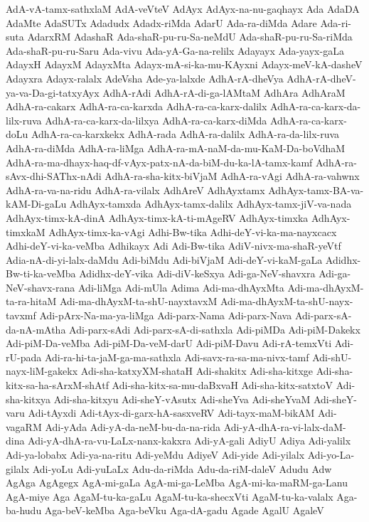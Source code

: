 {AdA-vA-tamx-sathxlaM
AdA-veVteV
AdAyx
AdAyx-na-nu-gaqhayx
Ada
AdaDA
AdaMte
AdaSUTx
Adadudx
Adadx-riMda
AdarU
Ada-ra-diMda
Adare
Ada-ri-suta
AdarxRM
AdashaR
Ada-shaR-pu-ru-Sa-neMdU
Ada-shaR-pu-ru-Sa-riMda
Ada-shaR-pu-ru-Saru
Ada-vivu
Ada-yA-Ga-na-relilx
Adayayx
Ada-yayx-gaLa
AdayxH
AdayxM
AdayxMta
Adayx-mA-si-ka-mu-KAyxni
Adayx-meV-kA-dasheV
Adayxra
Adayx-ralalx
AdeVsha
Ade-ya-lalxde
AdhA-rA-dheVya
AdhA-rA-dheV-ya-va-Da-gi-tatxyAyx
AdhA-rAdi
AdhA-rA-di-ga-lAMtaM
AdhAra
AdhAraM
AdhA-ra-cakarx
AdhA-ra-ca-karxda
AdhA-ra-ca-karx-dalilx
AdhA-ra-ca-karx-da-lilx-ruva
AdhA-ra-ca-karx-da-lilxya
AdhA-ra-ca-karx-diMda
AdhA-ra-ca-karx-doLu
AdhA-ra-ca-karxkekx
AdhA-rada
AdhA-ra-dalilx
AdhA-ra-da-lilx-ruva
AdhA-ra-diMda
AdhA-ra-liMga
AdhA-ra-mA-naM-da-mu-KaM-Da-boVdhaM
AdhA-ra-ma-dhayx-haq-df-vAyx-patx-nA-da-biM-du-ka-lA-tamx-kamf
AdhA-ra-sAvx-dhi-SAThx-nAdi
AdhA-ra-sha-kitx-biVjaM
AdhA-ra-vAgi
AdhA-ra-vahwnx
AdhA-ra-va-na-ridu
AdhA-ra-vilalx
AdhAreV
AdhAyxtamx
AdhAyx-tamx-BA-va-kAM-Di-gaLu
AdhAyx-tamxda
AdhAyx-tamx-dalilx
AdhAyx-tamx-jiV-va-nada
AdhAyx-timx-kA-dinA
AdhAyx-timx-kA-ti-mAgeRV
AdhAyx-timxka
AdhAyx-timxkaM
AdhAyx-timx-ka-vAgi
Adhi-Bw-tika
Adhi-deY-vi-ka-ma-nayxcacx
Adhi-deY-vi-ka-veMba
Adhikayx
Adi
Adi-Bw-tika
AdiV-nivx-ma-shaR-yeVtf
Adia-nA-di-yi-lalx-daMdu
Adi-biMdu
Adi-biVjaM
Adi-deY-vi-kaM-gaLa
Adidhx-Bw-ti-ka-veMba
Adidhx-deY-vika
Adi-diV-keSxya
Adi-ga-NeV-shavxra
Adi-ga-NeV-shavx-rana
Adi-liMga
Adi-mUla
Adima
Adi-ma-dhAyxMta
Adi-ma-dhAyxM-ta-ra-hitaM
Adi-ma-dhAyxM-ta-shU-nayxtavxM
Adi-ma-dhAyxM-ta-shU-nayx-tavxmf
Adi-pArx-Na-ma-ya-liMga
Adi-parx-Nama
Adi-parx-Nava
Adi-parx-sA-da-nA-mAtha
Adi-parx-sAdi
Adi-parx-sA-di-sathxla
Adi-piMDa
Adi-piM-Dakekx
Adi-piM-Da-veMba
Adi-piM-Da-veM-darU
Adi-piM-Davu
Adi-rA-temxVti
Adi-rU-pada
Adi-ra-hi-ta-jaM-ga-ma-sathxla
Adi-savx-ra-sa-ma-nivx-tamf
Adi-shU-nayx-liM-gakekx
Adi-sha-katxyXM-shataH
Adi-shakitx
Adi-sha-kitxge
Adi-sha-kitx-sa-ha-sArxM-shAtf
Adi-sha-kitx-sa-mu-daBxvaH
Adi-sha-kitx-satxtoV
Adi-sha-kitxya
Adi-sha-kitxyu
Adi-sheY-vAsutx
Adi-sheYva
Adi-sheYvaM
Adi-sheY-varu
Adi-tAyxdi
Adi-tAyx-di-garx-hA-sasxveRV
Adi-tayx-maM-bikAM
Adi-vagaRM
Adi-yAda
Adi-yA-da-neM-bu-da-na-rida
Adi-yA-dhA-ra-vi-lalx-daM-dina
Adi-yA-dhA-ra-vu-LaLx-nanx-kakxra
Adi-yA-gali
AdiyU
Adiya
Adi-yalilx
Adi-ya-lobabx
Adi-ya-na-ritu
Adi-yeMdu
AdiyeV
Adi-yide
Adi-yilalx
Adi-yo-La-gilalx
Adi-yoLu
Adi-yuLaLx
Adu-da-riMda
Adu-da-riM-daleV
Adudu
Adw
AgAga
AgAgegx
AgA-mi-gaLa
AgA-mi-ga-LeMba
AgA-mi-ka-maRM-ga-Lanu
AgA-miye
Aga
AgaM-tu-ka-gaLu
AgaM-tu-ka-shecxVti
AgaM-tu-ka-valalx
Aga-ba-hudu
Aga-beV-keMba
Aga-beVku
Aga-dA-gadu
Agade
AgalU
AgaleV
}
